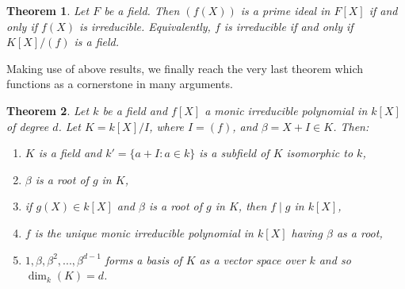 \documentclass[12pt,reqno]{amsart}
\newtheorem{thm}{Theorem}[section]
\theoremstyle{definition}
\theoremstyle{definition}
\begin{document}
\begin{thm}
    Let $F$ be a field. Then $(f(X))$ is a prime ideal in $F[X]$ if and only if $f(X)$ is irreducible. Equivalently, $f$ is irreducible if and only if $K[X]/(f)$ is a field.
\end{thm}

Making use of above results, we finally reach the very last theorem which functions as a cornerstone in many arguments.

\begin{thm}
    Let $k$ be a field and $f[X]$ a monic irreducible polynomial in $k[X]$ of degree $d$. Let $K=k[X]/I$, where $I=(f)$, and $\beta = X+I\in K$. Then:
    \begin{enumerate}
        \item $K$ is a field and $k'=\{a+I: a\in k\}$ is a subfield of $K$ isomorphic to $k$,
        \item $\beta$ is a root of $g$ in $K$,
        \item if $g(X)\in k[X]$ and $\beta$ is a root of $g$ in $K$, then $f\mid g$ in $k[X]$,
        \item $f$ is the unique monic irreducible polynomial in $k[X]$ having $\beta$ as a root,
        \item $1,\beta,\beta^2,...,\beta^{d-1}$ forms a basis of $K$ as a vector space over $k$ and so $\dim_k(K)=d$.
    \end{enumerate}
\end{thm}


\noindent\dotfill







\end{document}
